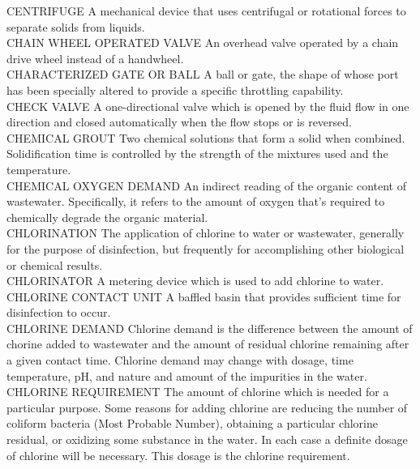 CENTRIFUGE
A mechanical device that uses centrifugal or rotational forces to separate solids from liquids.
\vspace{0.3cm}\\
CHAIN WHEEL OPERATED VALVE
An overhead valve operated by a chain drive wheel instead of a handwheel.
\vspace{0.3cm}\\
CHARACTERIZED GATE OR BALL
A ball or gate, the shape of whose port has been specially altered to provide a specific throttling capability.
\vspace{0.3cm}\\
CHECK VALVE
A one-directional valve which is opened by the fluid flow in one direction and closed automatically when the flow stops or is reversed.
\vspace{0.3cm}\\
CHEMICAL GROUT
Two chemical solutions that form a solid when combined. Solidification time is controlled by the strength of the mixtures used and the temperature. 
\vspace{0.3cm}\\
CHEMICAL OXYGEN DEMAND
An indirect reading of the organic content of wastewater. Specifically, it refers to the amount of oxygen that’s required to chemically degrade the organic material.
\vspace{0.3cm}\\
CHLORINATION
The application of chlorine to water or wastewater, generally for the purpose of disinfection, but frequently for accomplishing other biological or chemical results.
\vspace{0.3cm}\\
CHLORINATOR
A metering device which is used to add chlorine to water.
\vspace{0.3cm}\\
CHLORINE CONTACT UNIT
A baffled basin that provides sufficient time for disinfection to occur.
\vspace{0.3cm}\\
CHLORINE DEMAND
Chlorine demand is the difference between the amount of chorine added to wastewater and the amount of residual chlorine remaining after a given contact time. Chlorine demand may change with dosage, time temperature, pH, and nature and amount of the impurities in the water.
\vspace{0.3cm}\\
CHLORINE REQUIREMENT
The amount of chlorine which is needed for a particular purpose. Some reasons for adding chlorine are reducing the number of coliform bacteria (Most Probable Number), obtaining a particular chlorine residual, or oxidizing some substance in the water. In each case a definite dosage of chlorine will be necessary. This dosage is the chlorine requirement.
